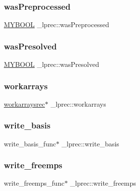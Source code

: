 \subsubsection{\texorpdfstring{was\+Preprocessed}{wasPreprocessed}}
{\footnotesize\ttfamily \hyperlink{lp__lib_8h_aad848328fb3018217ac9f01d97b6bd88}{M\+Y\+B\+O\+OL} \+\_\+lprec\+::was\+Preprocessed}

\mbox{\label{struct__lprec_a73a0b5185a95b845dc5e39c1e8bd6ec7}} 
\subsubsection{\texorpdfstring{was\+Presolved}{wasPresolved}}
{\footnotesize\ttfamily \hyperlink{lp__lib_8h_aad848328fb3018217ac9f01d97b6bd88}{M\+Y\+B\+O\+OL} \+\_\+lprec\+::was\+Presolved}

\mbox{\label{struct__lprec_a1c560c27977b300b3fd89764b3ad5cc6}} 
\subsubsection{\texorpdfstring{workarrays}{workarrays}}
{\footnotesize\ttfamily \hyperlink{lp__utils_8h_ae1acbc6dddf7681133805af55d6a6849}{workarraysrec}$\ast$ \+\_\+lprec\+::workarrays}

\mbox{\label{struct__lprec_a5fc7777f3e79a2c4b65f62e23307db8a}} 
\subsubsection{\texorpdfstring{write\+\_\+basis}{write\_basis}}
{\footnotesize\ttfamily write\+\_\+basis\+\_\+func$\ast$ \+\_\+lprec\+::write\+\_\+basis}

\mbox{\label{struct__lprec_a00dc181d40de6aff9a492c9c78a23c5a}} 
\subsubsection{\texorpdfstring{write\+\_\+freemps}{write\_freemps}}
{\footnotesize\ttfamily write\+\_\+freemps\+\_\+func$\ast$ \+\_\+lprec\+::write\+\_\+freemps}

